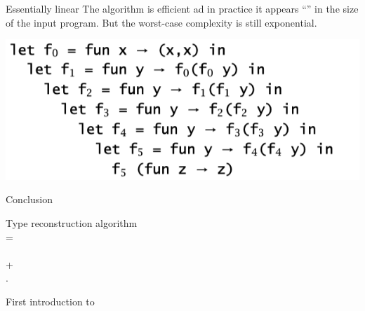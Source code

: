 \documentclass[usenames,dvipsnames]{beamer}
\begin{document}
\begin{frame}{Essentially linear}
The algorithm is efficient ad in practice it appears ``'' in the size of the input program. But the worst-case complexity is still \alert{exponential}.

\vspace{0.5cm}
\includegraphics[scale=0.4]{img/expo}

\end{frame}

\begin{frame}{Conclusion}
\begin{center}
Type reconstruction algorithm \\ =\\  \\+\\.
\end{center}


\vspace{1cm}

\begin{center}
First introduction to
\end{center}

\end{frame}

\end{document}
